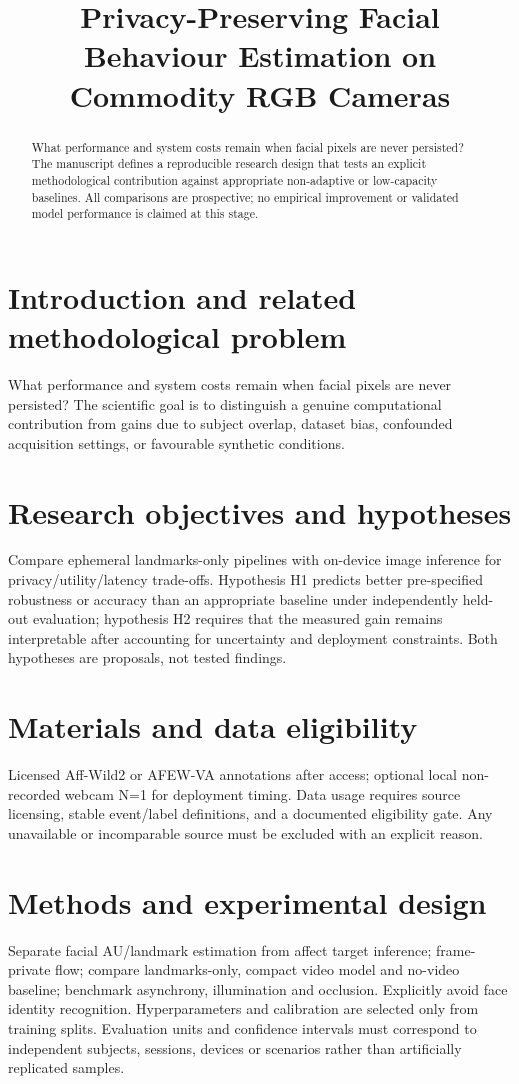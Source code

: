 \documentclass[11pt,a4paper]{article}
\title{Privacy-Preserving Facial Behaviour Estimation on Commodity RGB Cameras}
\author{}
\date{}
\begin{document}
\maketitle
\begin{abstract}
What performance and system costs remain when facial pixels are never persisted? The manuscript defines a reproducible research design that tests an explicit methodological contribution against appropriate non-adaptive or low-capacity baselines. All comparisons are prospective; no empirical improvement or validated model performance is claimed at this stage.
\end{abstract}
\section{Introduction and related methodological problem}
What performance and system costs remain when facial pixels are never persisted? The scientific goal is to distinguish a genuine computational contribution from gains due to subject overlap, dataset bias, confounded acquisition settings, or favourable synthetic conditions.
\section{Research objectives and hypotheses}
Compare ephemeral landmarks-only pipelines with on-device image inference for privacy/utility/latency trade-offs. Hypothesis H1 predicts better pre-specified robustness or accuracy than an appropriate baseline under independently held-out evaluation; hypothesis H2 requires that the measured gain remains interpretable after accounting for uncertainty and deployment constraints. Both hypotheses are proposals, not tested findings.
\section{Materials and data eligibility}
Licensed Aff-Wild2 or AFEW-VA annotations after access; optional local non-recorded webcam N=1 for deployment timing. Data usage requires source licensing, stable event/label definitions, and a documented eligibility gate. Any unavailable or incomparable source must be excluded with an explicit reason.
\section{Methods and experimental design}
Separate facial AU/landmark estimation from affect target inference; frame-private flow; compare landmarks-only, compact video model and no-video baseline; benchmark asynchrony, illumination and occlusion. Explicitly avoid face identity recognition. Hyperparameters and calibration are selected only from training splits. Evaluation units and confidence intervals must correspond to independent subjects, sessions, devices or scenarios rather than artificially replicated samples.
\end{document}
